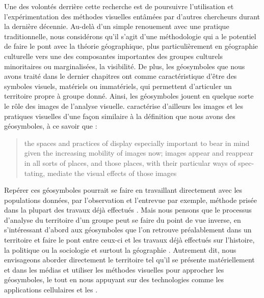 Une des volontés derrière cette recherche est de poursuivre l'utilisation et l'expérimentation des méthodes visuelles entâmées par d'autres chercheurs durant la dernière décennie. 
Au-delà d'un simple renouement avec une pratique traditionnelle, nous considérons qu'il s'agit d'une méthodologie qui a le potentiel de faire le pont avec la théorie géographique, plus particulièrement en géographie culturelle vers une des composantes importantes des groupes culturels minoritaires ou marginalisées, la visibilité. 
De plus, les géosymboles que nous avons traité dans le dernier chapitres ont comme caractéristique d'être des symboles visuels, matériels ou immatériels, qui permettent d'articuler un territoire propre à groupe donné. 
Ainsi, les géosymboles jouent en quelque sorte le rôle des images de l'analyse visuelle. 
\citeauthor{Rose2012} caractérise d'ailleurs les images et les pratiques visuelles d'une façon similaire à la définition que nous avons des géosymboles, à ce savoir que : \foreignblockquote{english}[{\cite[32]{Rose2012}}][.]{\textelp{} the spaces and   practices of display  especially important to bear in mind given   the increasing mobility of images now; images appear and reappear in all sorts   of places, and those places, with their particular ways of spectating, mediate   the visual effects of those images}.
Repérer ces géosymboles pourrait se faire en travaillant directement avec les populations données, par l'observation et l'entrevue par exemple, méthode prisée dans la plupart des travaux déjà effectués \citep[][pour ne citer que ceux-ci]{Giraud2014, Podmore2015a, Higgins1999}. 
Mais nous pensons que le processus d'analyse du territoire d'un groupe peut se faire du point de vue inverse, en s'intéressant d'abord aux géosymboles que l'on retrouve préalablement dans un territoire et faire le pont entre ceux-ci et les travaux déjà effectués sur l'histoire, la politique ou la sociologie et surtout la géographie \lgbt. 
Autrement dit, nous envisageons aborder directement le territoire tel qu'il se présente matériellement et dans les médias \lgbt{} et utiliser les méthodes visuelles pour approcher les géosymboles, le tout en nous appuyant sur des technologies comme les applications cellulaires et les \sig.


